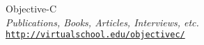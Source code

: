 \cleardoublepage
{}
{}
\begin{thebibliography}{}

 Objective-C\\
  \emph{Publications, Books, Articles, Interviews, etc.} \\
  \footnotesize \texttt{\url{http://virtualschool.edu/objectivec/}} \\
  
\end{thebibliography}
